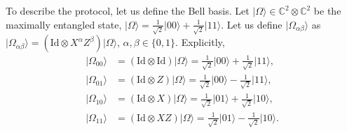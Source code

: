\documentclass{article}
\theoremstyle{definition}
\newcommand{\id}{\mathrm{Id}}
\newcommand{\ket}[1]{\vert #1 \rangle}
\begin{document}
To describe the protocol, let us define the Bell basis. Let $\ket{\Omega}\in \mathbb{C}^2 \otimes \mathbb{C}^2$ be the maximally entangled state, $\ket{\Omega} = \frac{1}{\sqrt{2}} \ket{00} + \frac{1}{\sqrt{2}} \ket{11}$. Let us define $\ket{\Omega_{\alpha \beta}}$ as $\ket{\Omega_{\alpha\beta}} = (\id \otimes X^\alpha Z^\beta)\ket{\Omega}$, $\alpha,\beta\in \{0,1\}$. Explicitly,
\begin{align*}
  \ket{\Omega_{00}} &= (\id\otimes \id) \ket{\Omega} = \frac{1}{\sqrt{2}} \ket{00} + \frac{1}{\sqrt{2}} \ket{11},\\
  \ket{\Omega_{01}} &= (\id\otimes Z)\ket{\Omega} = \frac{1}{\sqrt{2}} \ket{00} - \frac{1}{\sqrt{2}} \ket{11},\\
  \ket{\Omega_{10}} &= (\id\otimes X)\ket{\Omega} = \frac{1}{\sqrt{2}} \ket{01} + \frac{1}{\sqrt{2}} \ket{10},\\
  \ket{\Omega_{11}} &= (\id\otimes XZ)\ket{\Omega} = \frac{1}{\sqrt{2}} \ket{01} - \frac{1}{\sqrt{2}} \ket{10}.  
\end{align*} 
\end{document}

